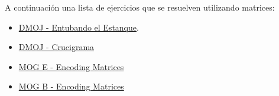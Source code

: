 A continuación una lista de ejercicios que se resuelven utilizando matrices:

\begin{itemize}
	\item \href{https://dmoj.uclv.edu.cu/problem/plumb} {DMOJ - Entubando el Estanque}.
	\item \href{https://dmoj.uclv.edu.cu/problem/crosswords} {DMOJ - Crucigrama}
	\item \href{https://matcomgrader.com/problem/9679/encoding-matrices/} {MOG E - Encoding Matrices}
    \item \href{https://matcomgrader.com/problem/9720/encoding-matrices/} {MOG B - Encoding Matrices}
\end{itemize}